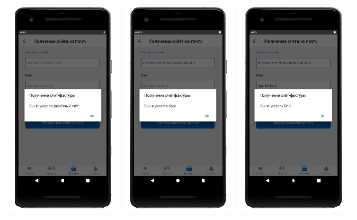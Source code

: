 \begin{figure}[!htb]\centering
    \begin{minipage}{0.24\textwidth}
        \centering

        \includegraphics[height=6cm]
        {images/mobile/order/order-check-1.png}
    \end{minipage}
    \begin{minipage}{0.24\textwidth}
        \centering

        \includegraphics[height=6cm]
        {images/mobile/order/order-check-2.png}
    \end{minipage}
    \begin{minipage}{0.24\textwidth}
        \centering

        \includegraphics[height=6cm]
        {images/mobile/order/order-check-3.png}
    \end{minipage}
    \begin{minipage}{0.24\textwidth}
        \centering


\end{minipage}
\end{figure}
